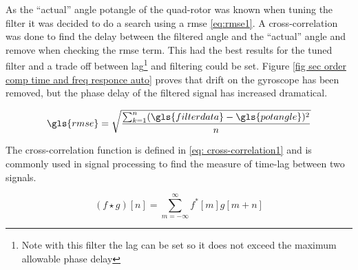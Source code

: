 As the \enquote{actual} angle \gls{potangle} of the quad-rotor was known when tuning the filter it was decided to do a search using a \gls{rmse} \eqref{eq:rmse1}. A cross-correlation was done to find the delay between the filtered angle and the \enquote{actual} angle and remove when checking the \gls{rmse} term. This had the best results for the tuned filter and a trade off between lag\footnote{Note with this filter the lag can be set so it does not exceed the maximum allowable phase delay} and filtering could be set. Figure \ref{fig sec order comp time and freq responce auto}	proves that drift on the gyroscope has been removed, but the phase delay of the filtered signal has increased dramatical. 

\begin{equation}
	\gls{rmse} = \sqrt{\frac{\sum_{k = 1}^{n} (\gls{filterdata} -\gls{potangle})^2}{n}} \label{eq:rmse1}
\end{equation}

The cross-correlation function is defined in \eqref{eq: cross-correlation1} and is commonly used in signal processing to find the measure of time-lag between two signals.

\begin{equation}
	(f \star g)[n] = \sum_{m = -\infty}^{\infty} f^*[m]g[m+n] \label{eq: cross-correlation1}
\end{equation}



